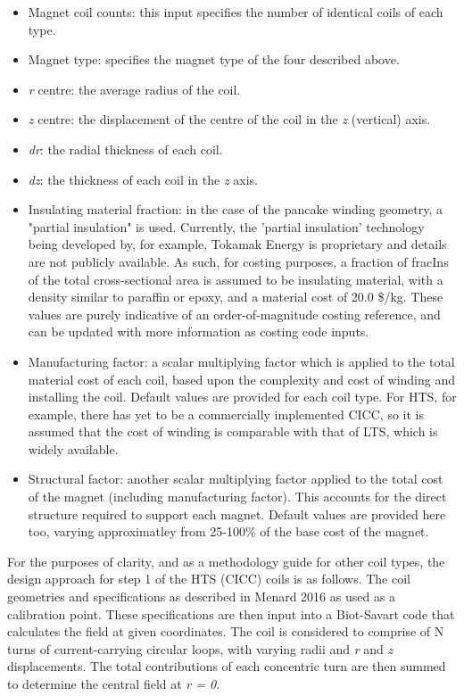 \begin{itemize}
    \item Magnet coil counts: this input specifies the number of identical coils of each type.
    \item Magnet type: specifies the magnet type of the four described above.
    \item \textit{r} centre: the average radius of the coil.
    \item \textit{z} centre: the displacement of the centre of the coil in the \textit{z} (vertical) axis.
    \item \textit{dr}: the radial thickness of each coil.
    \item \textit{dz}: the thickness of each coil in the \textit{z} axis.
    \item Insulating material fraction: in the case of the pancake winding geometry, a "partial insulation" is used. Currently, the 'partial insulation' technology being developed by, for example, Tokamak Energy is proprietary and details are not publicly available. As such, for costing purposes, a fraction of fracIns of the total cross-sectional area is assumed to be insulating material, with a density similar to paraffin or epoxy, and a material cost of 20.0 \$/kg. These values are purely indicative of an order-of-magnitude costing reference, and can be updated with more information as costing code inputs.
    \item Manufacturing factor: a scalar multiplying factor which is applied to the total material cost of each coil, based upon the complexity and cost of winding and installing the coil. Default values are provided for each coil type. For HTS, for example, there has yet to be a commercially implemented CICC, so it is assumed that the cost of winding is comparable with that of LTS, which is widely available. 
    \item Structural factor: another scalar multiplying factor applied to the total cost of the magnet (including manufacturing factor). This accounts for the direct structure required to support each magnet. Default values are provided here too, varying approximatley from 25-100\% of the base cost of the magnet.
\end{itemize}

For the purposes of clarity, and as a methodology guide for other coil types, the design approach for step 1 of the HTS (CICC) coils is as follows. The coil geometries and specifications as described in Menard 2016 \cite{Menard2016} as used as a calibration point. These specifications are then input into a Biot-Savart code that calculates the field at given coordinates. The coil is considered to comprise of N turns of current-carrying circular loops, with varying radii and \textit{r} and \textit{z} displacements. The total contributions of each concentric turn are then summed to determine the central field at \textit{r = 0}.

